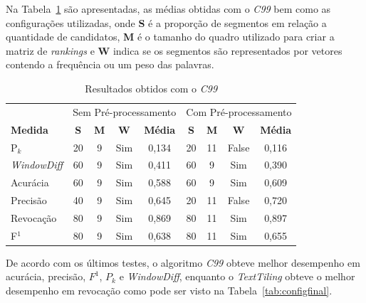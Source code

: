 Na Tabela~\ref{tab:resultadosc99} são apresentadas, as médias obtidas com o \textit{C99} bem como as configurações utilizadas, onde \textbf{S} é a proporção de segmentos em relação a quantidade de candidatos, \textbf{M} é o tamanho do quadro utilizado para criar a matriz de \textit{rankings} e \textbf{W} indica se os segmentos são representados por vetores contendo a frequência ou um peso das palavras.


\begin{table}[!h]
	\centering
	\begin{tabular}{|l||c|c|c|c||c|c|c|c|} \hline

		& \multicolumn{4}{c||}{Sem Pré-processamento} 
		& \multicolumn{4}{c|}{Com Pré-processamento}\\			

		\textbf{Medida} & 
		\textbf{S} & 
		\textbf{M} & 
		\textbf{W} & 
		\textbf{Média} &
		\textbf{S} & 
		\textbf{M} & 
		\textbf{W} & 
		\textbf{Média} \\	\hline

		P$_k$				& 20 & 9 & Sim & 0,134& 20 & 11 & False	& 0,116 \\ \hline  
		\textit{WindowDiff}	& 60 & 9 & Sim & 0,411& 60 &  9 & Sim 	& 0,390 \\ \hline  
		Acurácia			& 60 & 9 & Sim & 0,588& 60 &  9 & Sim 	& 0,609 \\ \hline  
		Precisão			& 40 & 9 & Sim & 0,645& 20 & 11 & False	& 0,720 \\ \hline  
		Revocação			& 80 & 9 & Sim & 0,869& 80 & 11 & Sim 	& 0,897 \\ \hline  
		F$^1$				& 80 & 9 & Sim & 0,638& 80 & 11 & Sim 	& 0,655 \\ \hline  

	\end{tabular}
	\caption{Resultados obtidos com o \textit{C99}}
	\label{tab:resultadosc99}
\end{table}




De acordo com os últimos testes, o algoritmo \textit{C99} obteve melhor desempenho em acurácia, precisão, $F^1$, $P_k$ e \textit{WindowDiff}, enquanto o \textit{TextTiling} obteve o melhor desempenho em revocação como pode ser visto na Tabela~\ref{tab:configfinal}. 









